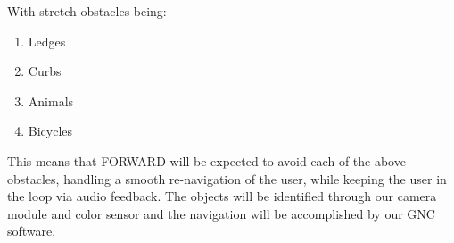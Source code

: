 \noindent With stretch obstacles being:
\begin{enumerate}
	\item Ledges
	\item Curbs
	\item Animals
	\item Bicycles
\end{enumerate}

\noindent This means that FORWARD will be expected to avoid each of the above obstacles, handling a smooth re-navigation of the user, while keeping the user in the loop via audio feedback. The objects will be identified through our camera module and color sensor and the navigation will be accomplished by our GNC software. \\